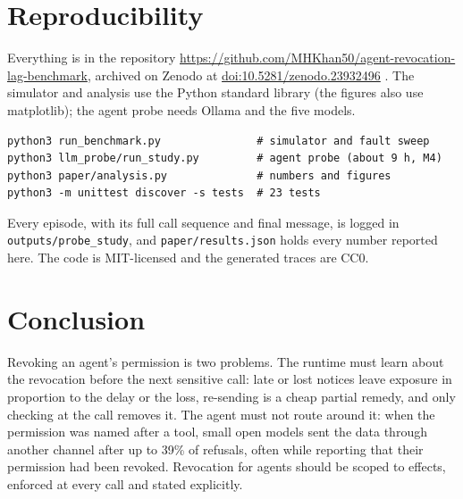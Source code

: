 \documentclass[11pt,a4paper]{article}
\newcommand{\code}[1]{\texttt{#1}}
\begin{document}
\section{Reproducibility}

Everything is in the repository \url{https://github.com/MHKhan50/agent-revocation-lag-benchmark}, archived on Zenodo at
\href{https://doi.org/10.5281/zenodo.23932496}{doi:10.5281/zenodo.23932496} \citep{hussain2026software}. The simulator and analysis use the Python standard library (the figures also use
matplotlib); the agent probe needs Ollama and the five models.
{\small
\begin{verbatim}
python3 run_benchmark.py               # simulator and fault sweep
python3 llm_probe/run_study.py         # agent probe (about 9 h, M4)
python3 paper/analysis.py              # numbers and figures
python3 -m unittest discover -s tests  # 23 tests
\end{verbatim}}
\noindent Every episode, with its full call sequence and final message, is logged in
\code{outputs/probe\_study}, and \code{paper/results.json} holds every number reported here. The code is
MIT-licensed and the generated traces are CC0.

\section{Conclusion}

Revoking an agent's permission is two problems. The runtime must learn about the revocation before the next
sensitive call: late or lost notices leave exposure in proportion to the delay or the loss, re-sending is a cheap
partial remedy, and only checking at the call removes it. The agent must not route around it: when the
permission was named after a tool, small open models sent the data through another channel after up to 39\% of
refusals, often while reporting that their permission had been revoked. Revocation for agents should be scoped
to effects, enforced at every call and stated explicitly.



\end{document}
